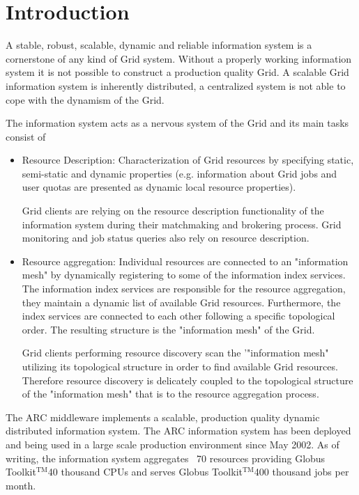 \documentclass{article}
\newcommand{\gt}{Globus Toolkit$\mathrm{^{TM}}$}
\begin{document}
\section{Introduction}

A stable, robust, scalable, dynamic and reliable information system is
a cornerstone of any kind of Grid system. Without a properly working
information system it is not possible to construct a production
quality Grid. A scalable Grid information system is inherently
distributed, a centralized system is not able to cope with the
dynamism of the Grid.


The information system acts as a nervous system of the Grid and its
main tasks consist of
\begin{itemize}
\item Resource Description:
Characterization of Grid resources by specifying static, semi-static
and dynamic properties (e.g. information about Grid jobs and user
quotas are presented as dynamic local resource properties).

Grid clients are relying on the resource description functionality of
the information system during their matchmaking and brokering
process. Grid monitoring and job status queries also rely on resource
description.

\item Resource aggregation:
Individual resources are connected to an "information mesh" by
dynamically registering to some of the information index services. The
information index services are responsible for the resource
aggregation, they maintain a dynamic list of available Grid resources.
Furthermore, the index services are connected to each other following
a specific topological order. The resulting structure is the
"information mesh" of the Grid.

Grid clients performing resource discovery scan the '"information
mesh" utilizing its topological structure in order to find available
Grid resources.  Therefore resource discovery is delicately coupled to
the topological structure of the "information mesh" that is to the
resource aggregation process.
\end{itemize}

The ARC middleware implements a scalable, production quality
dynamic distributed information system. The ARC information system 
has been deployed and being used in a large scale production environment 
since May 2002. As of writing, the information system aggregates ~70 
resources providing \gt 40 thousand CPUs and serves \gt 400 thousand jobs per month.
\end{document}
